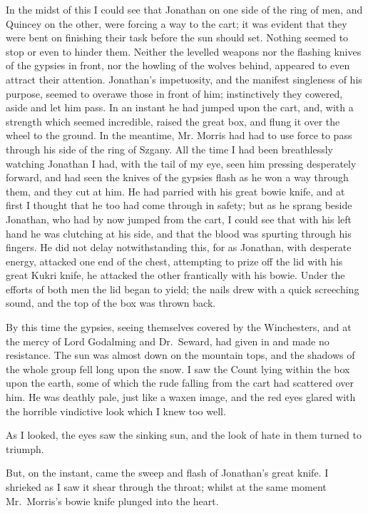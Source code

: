 \documentclass[12pt,openright]{book}
\begin{document}
In the midst of this I could see that Jonathan on one side of the ring of men, and Quincey on the other, were forcing a way to the cart; it was evident that they were bent on finishing their task before the sun should set. Nothing seemed to stop or even to hinder them. Neither the levelled weapons nor the flashing knives of the gypsies in front, nor the howling of the wolves behind, appeared to even attract their attention. Jonathan’s impetuosity, and the manifest singleness of his purpose, seemed to overawe those in front of him; instinctively they cowered, aside and let him pass. In an instant he had jumped upon the cart, and, with a strength which seemed incredible, raised the great box, and flung it over the wheel to the ground. In the meantime, Mr. Morris had had to use force to pass through his side of the ring of Szgany. All the time I had been breathlessly watching Jonathan I had, with the tail of my eye, seen him pressing desperately forward, and had seen the knives of the gypsies flash as he won a way through them, and they cut at him. He had parried with his great bowie knife, and at first I thought that he too had come through in safety; but as he sprang beside Jonathan, who had by now jumped from the cart, I could see that with his left hand he was clutching at his side, and that the blood was spurting through his fingers. He did not delay notwithstanding this, for as Jonathan, with desperate energy, attacked one end of the chest, attempting to prize off the lid with his great Kukri knife, he attacked the other frantically with his bowie. Under the efforts of both men the lid began to yield; the nails drew with a quick screeching sound, and the top of the box was thrown back.

By this time the gypsies, seeing themselves covered by the Winchesters, and at the mercy of Lord Godalming and Dr. Seward, had given in and made no resistance. The sun was almost down on the mountain tops, and the shadows of the whole group fell long upon the snow. I saw the Count lying within the box upon the earth, some of which the rude falling from the cart had scattered over him. He was deathly pale, just like a waxen image, and the red eyes glared with the horrible vindictive look which I knew too well.

As I looked, the eyes saw the sinking sun, and the look of hate in them turned to triumph.

But, on the instant, came the sweep and flash of Jonathan’s great knife. I shrieked as I saw it shear through the throat; whilst at the same moment Mr. Morris’s bowie knife plunged into the heart.
\end{document}
